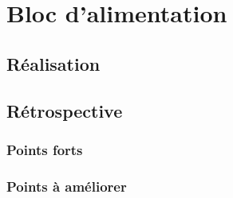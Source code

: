 \section{Bloc d'alimentation}
\label{chap:alimentation}

\subsection{Réalisation}



\subsection{Rétrospective}

\subsubsection{Points forts}



\subsubsection{Points à améliorer}
